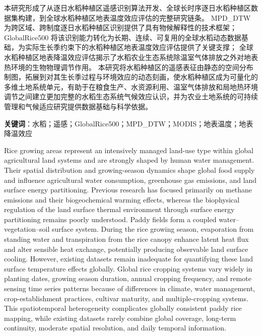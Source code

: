 本研究形成了从逐日水稻种植区遥感识别算法开发、全球长时序逐日水稻种植区数据集构建，到全球水稻种植区地表温度效应评估的完整研究链条。
MPD\_DTW 为跨区域、跨制度逐日水稻种植区识别提供了具有物候解释性的技术框架；
GlobalRice500 将该识别能力转化为长期、连续、可复用的全球水稻动态数据基础，为实际生长季约束下的水稻种植区地表温度效应评估提供了关键支撑；
全球水稻种植区地表降温效应评估揭示了水稻农业生态系统除温室气体排放之外对地表热环境的生物物理调节作用。
本研究将水稻种植区的遥感表征由静态的空间分布制图，拓展到对其生长季过程与环境效应的动态刻画，使水稻种植区成为可量化的多维土地系统单元，有助于在粮食生产、水资源利用、温室气体排放和局地热环境调节之间建立更加完整的水稻生态系统气候效应认识，并为农业土地系统的可持续管理和气候适应研究提供数据基础与科学依据。

\noindent \textbf{关键词}：水稻；遥感；GlobalRice500；MPD\_DTW；MODIS；地表温度；地表降温效应


\cleardoublepage
{}

Rice growing areas represent an intensively managed land-use type within global agricultural land systems and are strongly shaped by human water management. Their spatial distribution and growing-season dynamics shape global food supply and influence agricultural water consumption, greenhouse gas emissions, and land surface energy partitioning.
Previous research has focused primarily on methane emissions and their biogeochemical warming effects, whereas the biophysical regulation of the land surface thermal environment through surface energy partitioning remains poorly understood.
Paddy fields form a coupled water–vegetation–soil surface system. During the rice growing season, evaporation from standing water and transpiration from the rice canopy enhance latent heat flux and alter sensible heat exchange, potentially producing observable land surface cooling.
However, existing datasets remain inadequate for quantifying these land surface temperature effects globally. Global rice cropping systems vary widely in planting dates, growing season duration, annual cropping frequency, and remote sensing time series patterns because of differences in climate, water management, crop-establishment practices, cultivar maturity, and multiple-cropping systems. This spatiotemporal heterogeneity complicates globally consistent paddy rice mapping, while existing datasets rarely combine global coverage, long-term continuity, moderate spatial resolution, and daily temporal information.

